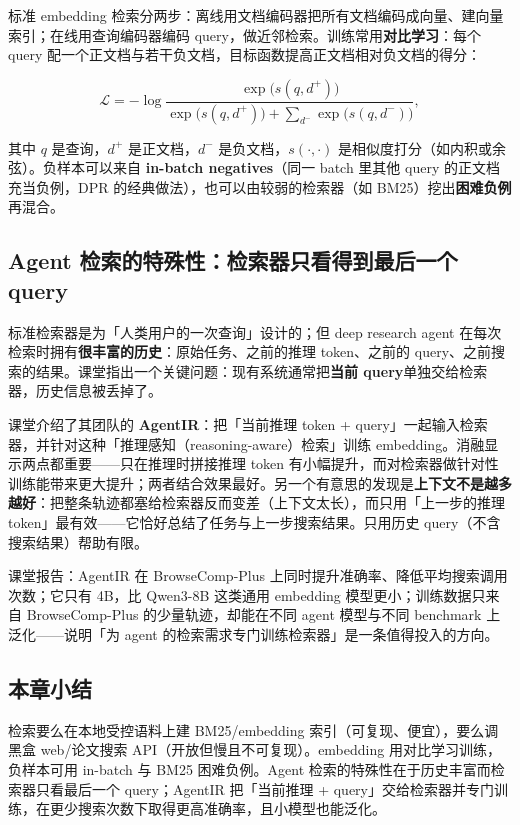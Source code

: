 \documentclass[a4paper]{article}
\begin{document}
标准 embedding 检索分两步：离线用文档编码器把所有文档编码成向量、建向量索引；在线用查询编码器编码 query，做近邻检索。训练常用\textbf{对比学习}：每个 query 配一个正文档与若干负文档，目标函数提高正文档相对负文档的得分：

$$
\mathcal{L} = -\log \frac{\exp\big(s(q, d^+)\big)}{\exp\big(s(q, d^+)\big) + \sum_{d^-} \exp\big(s(q, d^-)\big)},
$$

其中 $q$ 是查询，$d^+$ 是正文档，$d^-$ 是负文档，$s(\cdot,\cdot)$ 是相似度打分（如内积或余弦）。负样本可以来自 \textbf{in-batch negatives}（同一 batch 里其他 query 的正文档充当负例，DPR 的经典做法），也可以由较弱的检索器（如 BM25）挖出\textbf{困难负例}再混合。

\subsection{Agent 检索的特殊性：检索器只看得到最后一个 query}

标准检索器是为「人类用户的一次查询」设计的；但 deep research agent 在每次检索时拥有\textbf{很丰富的历史}：原始任务、之前的推理 token、之前的 query、之前搜索的结果。课堂指出一个关键问题：现有系统通常把\textbf{当前 query}单独交给检索器，历史信息被丢掉了。

课堂介绍了其团队的 \textbf{AgentIR}：把「当前推理 token + query」一起输入检索器，并针对这种「推理感知（reasoning-aware）检索」训练 embedding。消融显示两点都重要——只在推理时拼接推理 token 有小幅提升，而对检索器做针对性训练能带来更大提升；两者结合效果最好。另一个有意思的发现是\textbf{上下文不是越多越好}：把整条轨迹都塞给检索器反而变差（上下文太长），而只用「上一步的推理 token」最有效——它恰好总结了任务与上一步搜索结果。只用历史 query（不含搜索结果）帮助有限。

课堂报告：AgentIR 在 BrowseComp-Plus 上同时提升准确率、降低平均搜索调用次数；它只有 4B，比 Qwen3-8B 这类通用 embedding 模型更小；训练数据只来自 BrowseComp-Plus 的少量轨迹，却能在不同 agent 模型与不同 benchmark 上泛化——说明「为 agent 的检索需求专门训练检索器」是一条值得投入的方向。

\subsection{本章小结}
检索要么在本地受控语料上建 BM25/embedding 索引（可复现、便宜），要么调黑盒 web/论文搜索 API（开放但慢且不可复现）。embedding 用对比学习训练，负样本可用 in-batch 与 BM25 困难负例。Agent 检索的特殊性在于历史丰富而检索器只看最后一个 query；AgentIR 把「当前推理 + query」交给检索器并专门训练，在更少搜索次数下取得更高准确率，且小模型也能泛化。
\end{document}
